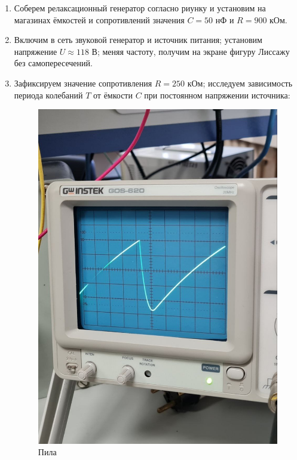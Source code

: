 \documentclass[a4paper,12pt]{article} %
\begin{document}
\begin{enumerate}
    


\item  Соберем релаксационный генератор согласно риунку и установим на магазинах ёмкостей и сопротивлений значения $C = 50 $ нФ и $R = 900 $ кОм.

\item  Включим в сеть звуковой генератор и источник питания; установим напряжение $U \approx 118$ В; меняя частоту, получим на экране фигуру Лиссажу без самопересечений.

\item  Зафиксируем значение сопротивления $R = 250$ кОм; исследуем зависимость периода колебаний $T$ от ёмкости $C$ при постоянном напряжении источника:


\begin{figure}[H]
    \centering
    \includegraphics[scale=0.2]{pila.png}
    \caption{Пила}
    \label{tc}
\end{figure}


\end{enumerate}
\end{document}
